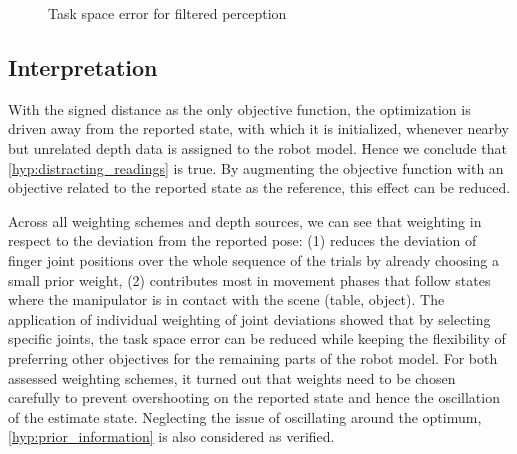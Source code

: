 \begin{figure}
\centering
{}
\caption{Task space error for filtered perception}
\label{fig:filter_pose_error}
\end{figure}


\subsection{Interpretation}

With the signed distance as the only objective function, the optimization is driven away from the reported state, with which it is initialized, whenever nearby but unrelated depth data is assigned to the robot model. Hence we conclude that \cref{hyp:distracting_readings} is true. By augmenting the objective function with an objective related to the reported state as the reference, this effect can be reduced.

Across all weighting schemes and depth sources, we can see that weighting in respect to the deviation from the reported pose: (1) reduces the deviation of finger joint positions over the whole sequence of the trials by already choosing a small prior weight, (2) contributes most in movement phases that follow states where the manipulator is in contact with the scene (table, object). The application of individual weighting of joint deviations showed that by selecting specific joints, the task space error can be reduced while keeping the flexibility of preferring other objectives for the remaining parts of the robot model. For both assessed weighting schemes, it turned out that weights need to be chosen carefully to prevent overshooting on the reported state and hence the oscillation of the estimate state. Neglecting the issue of oscillating around the optimum, \cref{hyp:prior_information} is also considered as verified.

